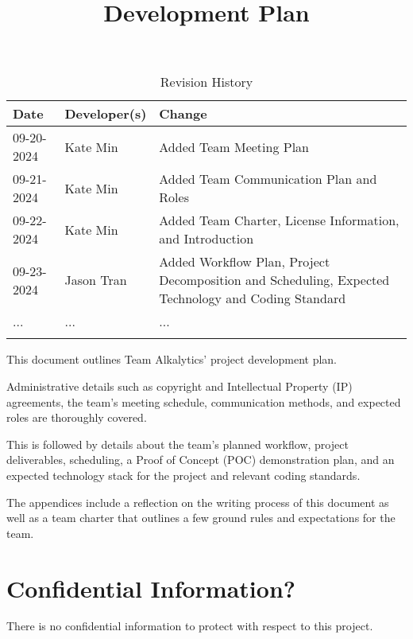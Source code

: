 \documentclass{article}
\title{Development Plan\\\progname}
\author{\authname}
\date{}
\begin{document}
\maketitle

\begin{table}[hp]
\caption{Revision History} \label{TblRevisionHistory}
\begin{tabularx}{\textwidth}{llX}
\toprule
\textbf{Date} & \textbf{Developer(s)} & \textbf{Change}\\
\midrule
09-20-2024 & Kate Min & Added Team Meeting Plan\\
09-21-2024 & Kate Min & Added Team Communication Plan and Roles\\
09-22-2024 & Kate Min & Added Team Charter, License Information, and
Introduction\\
09-23-2024 & Jason Tran & Added Workflow Plan, Project Decomposition and Scheduling, Expected Technology and
Coding Standard\\
... & ... & ...\\
\bottomrule
\label{table:1}
\end{tabularx}
\end{table}

\newpage{}

\noindent This document outlines Team Alkalytics' project development
plan.\newline

\noindent Administrative details such as copyright and Intellectual Property
(IP) agreements, the team's meeting schedule, communication methods, and
expected roles are thoroughly covered.\newline

\noindent This is followed by details about the team's planned workflow, project
deliverables, scheduling, a Proof of Concept (POC) demonstration plan, and an
expected technology stack for the project and relevant coding standards.\newline

\noindent The appendices include a reflection on the writing process of this
document as well as a team charter that outlines a few ground rules and
expectations for the team.

\section{Confidential Information?}

There is no confidential information to protect with respect to this project.
\end{document}
